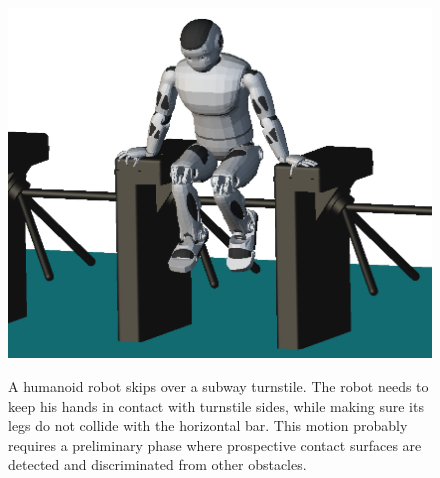 \begin{figure}
  \centering
      {\includegraphics[width = 0.8\linewidth]
        {src/chap4-conclusion/romeo-turnstile.png}}
      \caption{A humanoid robot skips over a subway turnstile. The
        robot needs to keep his hands in contact with turnstile sides,
        while making sure its legs do not collide with the horizontal
        bar. This motion probably requires a preliminary phase where
        prospective contact surfaces are detected and discriminated
        from other obstacles.}
      \label{fig:chap4-romeo-turnstile}
\end{figure}
